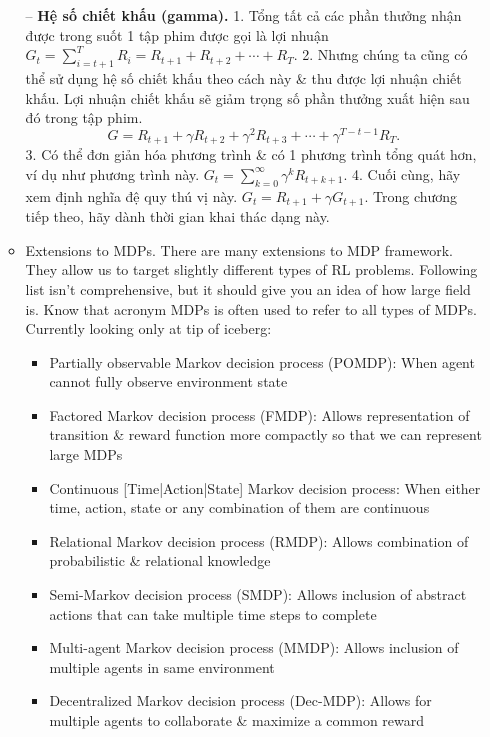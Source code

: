 \documentclass{article}
\begin{document}
\begin{itemize}
\begin{itemize}
        -- {\bf Hệ số chiết khấu (gamma).} 1. Tổng tất cả các phần thưởng nhận được trong suốt 1 tập phim được gọi là lợi nhuận $G_t = \sum_{i=t+1}^T R_i = R_{t+1} + R_{t+2} + \cdots + R_T$. 2. Nhưng chúng ta cũng có thể sử dụng hệ số chiết khấu theo cách này \& thu được lợi nhuận chiết khấu. Lợi nhuận chiết khấu sẽ giảm trọng số phần thưởng xuất hiện sau đó trong tập phim.
        \begin{equation*}
            G = R_{t+1} + \gamma R_{t+2} + \gamma^2R_{t+3} + \cdots + \gamma^{T - t - 1}R_T.
        \end{equation*}
        3. Có thể đơn giản hóa phương trình \& có 1 phương trình tổng quát hơn, ví dụ như phương trình này. $G_t = \sum_{k=0}^\infty \gamma^kR_{t + k + 1}$. 4. Cuối cùng, hãy xem định nghĩa đệ quy thú vị này. $G_t = R_{t+1} + \gamma G_{t+1}$. Trong chương tiếp theo, hãy dành thời gian khai thác dạng này.
        \item {\sf Extensions to MDPs.} There are many extensions to MDP framework. They allow us to target slightly different types of RL problems. Following list isn't comprehensive, but it should give you an idea of how large field is. Know that acronym MDPs is often used to refer to all types of MDPs. Currently looking only at tip of iceberg:
        \begin{itemize}
            \item Partially observable Markov decision process (POMDP): When agent cannot fully observe environment state
            \item Factored Markov decision process (FMDP): Allows representation of transition \& reward function more compactly so that we can represent large MDPs
            \item Continuous [Time|Action|State] Markov decision process: When either time, action, state or any combination of them are continuous
            \item Relational Markov decision process (RMDP): Allows combination of probabilistic \& relational knowledge
            \item Semi-Markov decision process (SMDP): Allows inclusion of abstract actions that can take multiple time steps to complete
            \item Multi-agent Markov decision process (MMDP): Allows inclusion of multiple agents in same environment
            \item Decentralized Markov decision process (Dec-MDP): Allows for multiple agents to collaborate \& maximize a common reward
        \end{itemize}

\end{itemize}
\end{itemize}
\end{document}
